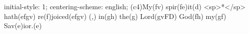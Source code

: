 initial-style: 1;
centering-scheme: english;
(c4)My(fv) spir(fe)it(d) <sp>*</sp> hath(efgv) re(f)joiced(efgv) (,) in(gh) the(g) Lord(gvFD) God(fh) my(gf) Sav(e)ior.(e)
